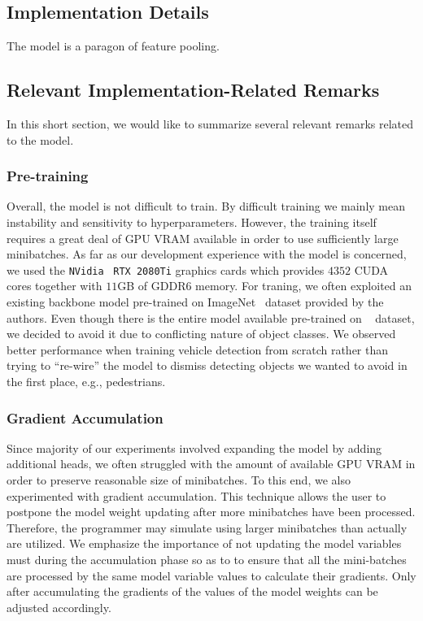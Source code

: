 \subsection{Implementation Details}

The \siammot{} model is a paragon of feature pooling.

\subsection{Relevant Implementation-Related Remarks}

In this short section, we would like to summarize several relevant remarks related to the \siammot{} model.

\subsubsection{Pre-training}

Overall, the model is not difficult to train. By difficult training we mainly mean instability and sensitivity to hyperparameters. However, the training itself requires a great deal of GPU VRAM available in order to use sufficiently large minibatches. As far as our development experience with the \siammot{} model is concerned, we used the \texttt{NVidia}~\cite{webnvidia} \texttt{RTX 2080Ti} graphics cards which provides $4352$ CUDA cores together with $11$GB of GDDR6 memory. For traning, we often exploited an existing backbone model pre-trained on ImageNet~\cite{deng2009imagenet} dataset provided by the authors. Even though there is the entire model available pre-trained on \mscoco{}~\cite{lin2014mscoco} dataset, we decided to avoid it due to conflicting nature of object classes. We observed better performance when training vehicle detection from scratch rather than trying to ``re-wire'' the model to dismiss detecting objects we wanted to avoid in the first place, e.g., pedestrians.

\subsubsection{Gradient Accumulation}

Since majority of our experiments involved expanding the model by adding additional heads, we often struggled with the amount of available GPU VRAM in order to preserve reasonable size of minibatches. To this end, we also experimented with gradient accumulation. This technique allows the user to postpone the model weight updating after more minibatches have been processed. Therefore, the programmer may simulate using larger minibatches than actually are utilized. We emphasize the importance of not updating the model variables must during the accumulation phase so as to to ensure that all the mini-batches are processed by the same model variable values to calculate their gradients. Only after accumulating the gradients of the values of the model weights can be adjusted accordingly.

